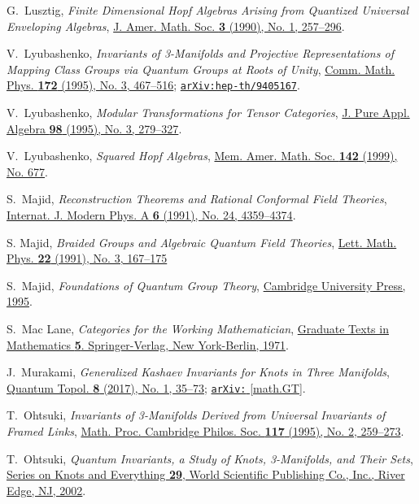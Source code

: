 \documentclass[a4paper,reqno]{amsart}
\theoremstyle{definition}
\theoremstyle{remark}
\newcommand\arxiv[2]{\href{https://arXiv.org/abs/#1}{\texttt{arXiv:\allowbreak #1} #2}}
\newcommand\doi[2]{\href{https://doi.org/#1}{#2}}
\begin{document}
\begin{thebibliography}{99}
 G.~Lusztig,
 \textit{Finite Dimensional Hopf Algebras Arising from Quantized Universal Enveloping Algebras},
 \doi{10.1090/S0894-0347-1990-1013053-9}{J. Amer. Math. Soc. \textbf{3} (1990), No. 1, 257--296}.
 
 V.~Lyubashenko,
 \textit{Invariants of 3-Manifolds and Projective Representations of Mapping Class Groups via Quantum Groups at Roots of Unity},
 \doi{10.1007/BF02101805}{Comm. Math. Phys. \textbf{172} (1995), No. 3, 467--516};
 \href{http://arXiv.org/abs/hep-th/9405167}{\texttt{arXiv:hep-th/9405167}}.
 
 V.~Lyubashenko,
 \textit{Modular Transformations for Tensor Categories},
 \doi{10.1016/0022-4049(94)00045-K}{J. Pure Appl. Algebra \textbf{98} (1995), No. 3, 279--327}.
 
 V.~Lyubashenko,
 \textit{Squared Hopf Algebras},
 \doi{10.1090/memo/0677}{Mem. Amer. Math. Soc. \textbf{142} (1999), No. 677}.
 
 S.~Majid,
 \textit{Reconstruction Theorems and Rational Conformal Field Theories},
 \doi{10.1142/S0217751X91002100}{Internat. J. Modern Phys. A \textbf{6} (1991), No. 24, 4359--4374}.
 
 S. Majid,
 \textit{Braided Groups and Algebraic Quantum Field Theories},
 \doi{10.1007/BF00403542}{Lett. Math. Phys. \textbf{22} (1991), No. 3, 167--175}
 
 S.~Majid, 
 \textit{Foundations of Quantum Group Theory},
 \doi{10.1017/CBO9780511613104}{Cambridge University Press, 1995}.
 
 S.~Mac Lane, 
 \textit{Categories for the Working Mathematician},
 \doi{10.1007/978-1-4612-9839-7}{Graduate Texts in Mathematics \textbf{5}. Springer-Verlag, New York-Berlin, 1971}.
 
 J.~Murakami,  
 \textit{Generalized Kashaev Invariants for Knots in Three Manifolds},  
 \doi{10.4171/QT/86}{Quantum Topol. \textbf{8} (2017), No. 1, 35--73};
 \arxiv{1312.0330}{[math.GT]}.
 
 T.~Ohtsuki,
 \textit{Invariants of 3-Manifolds Derived from Universal Invariants of Framed Links},
 \doi{10.1017/S0305004100073102}{Math. Proc. Cambridge Philos. Soc. \textbf{117} (1995), No. 2, 259--273}.
 
 T.~Ohtsuki,
 \textit{Quantum Invariants, a Study of Knots, 3-Manifolds, and Their Sets},
 \doi{10.1142/4746}{Series on Knots and Everything \textbf{29}, World Scientific Publishing Co., Inc., River Edge, NJ, 2002}.
 

\end{thebibliography}
\end{document}
